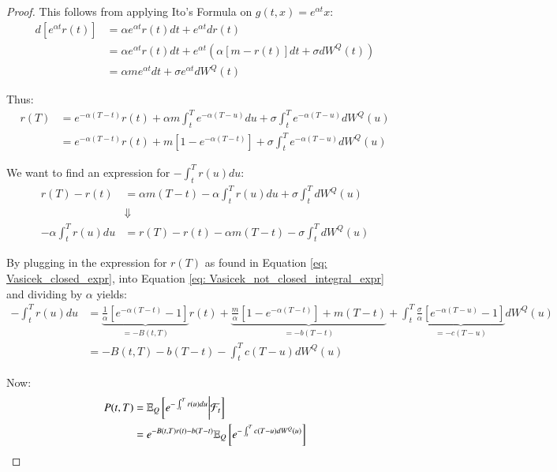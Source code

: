 \begin{proof}
This follows from applying Ito's Formula on $g(t,x) = e^{\alpha t}x$: 
\begin{align*}
d[e^{\alpha t}r(t)] &= 
\alpha e^{\alpha t}r(t)dt + e^{\alpha t}dr(t) \\ 
&= 
\alpha e^{\alpha t}r(t)dt + e^{\alpha t}\left(\alpha[m - r(t)]dt + \sigma dW^{Q}(t)\right) \\ 
&= 
\alpha m e^{\alpha t}dt + \sigma e^{\alpha t}dW^{Q}(t)
\end{align*}

Thus: 
\begin{align}
\label{eq: Vasicek_closed_expr}
r(T) &= e^{-\alpha(T-t)}r(t) + \alpha m \int_{t}^{T}e^{-\alpha(T-u)}du + \sigma \int_{t}^{T}e^{-\alpha(T-u)}dW^{Q}(u)
\nonumber
\\ 
&= 
e^{-\alpha(T-t)}r(t) + m[1-e^{-\alpha(T-t)}] 
+ \sigma \int_{t}^{T}e^{-\alpha(T-u)}dW^{Q}(u)
\end{align}

We want to find an expression for $-\int_{t}^{T}r(u)du$: 
\begin{align}
\label{eq: Vasicek_not_closed_integral_expr}
 r(T) - r(t) 
 &= 
 \alpha m(T-t)- \alpha\int_{t}^{T}r(u)du + \sigma\int_{t}^{T}dW^{Q}(u) \nonumber \\ 
 &\Downarrow \nonumber \\ 
- \alpha\int_{t}^{T}r(u)du &= 
r(T) - r(t) -\alpha m(T-t)-\sigma \int_{t}^{T}dW^{Q}(u)
\end{align}

By plugging in the expression for $r(T)$ as found in Equation \ref{eq: Vasicek_closed_expr}, into Equation \ref{eq: Vasicek_not_closed_integral_expr} and dividing by $\alpha$ yields:  
\begin{align}
\label{eq: Vasicek_closed_expr_integral}
-\int_{t}^{T}r(u)du 
&= 
\underbrace{
\frac{1}{\alpha}[e^{-\alpha(T-t)}-1]}_{= -B(t,T)}
r(t) + \underbrace{
\frac{m}{\alpha}[1-e^{-\alpha(T-t)}] + m(T-t)
}_{= -b(T-t)} 
+
\int_{t}^{T}
\underbrace{
\frac{\sigma}{\alpha}[e^{-\alpha(T-u)}-1]
}_{= -c(T-u)}
dW^{Q}(u) \\ 
&= 
-B(t,T) - b(T-t) - \int_{t}^{T}c(T-u)dW^{Q}(u) \nonumber
\end{align}

Now: 
\begin{align*}
P(t,T) 
&= 
\mathbb{E}_{Q}\left[e^{-\int_{t}^{T}r(u)du}\bigg{|}\mathcal{F}_{t}\right] \\ 
&= e^{
-B(t,T)r(t) -b(T-t)
}
\mathbb{E}_{Q}\left[
e^{
-\int_{t}^{T}c(T-u)dW^{Q}(u)
}
\right]
\end{align*}


\end{proof}
